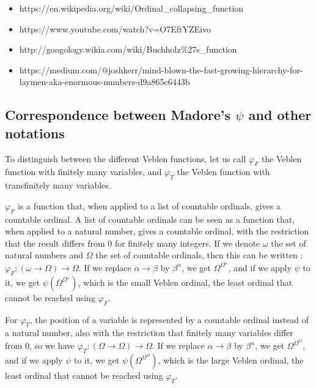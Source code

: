 \documentclass[10pt]{article}
\begin{document}
\begin{itemize}
     \setlength{\itemsep}{1pt}
     \setlength{\parskip}{0pt}
     \setlength{\parsep}{0pt}
\item https://en.wikipedia.org/wiki/Ordinal\_collapsing\_function
\item https://www.youtube.com/watch?v=O7EftYZEivo
\item http://googology.wikia.com/wiki/Buchholz\%27s\_function
\item https://medium.com/@joshkerr/mind-blown-the-fast-growing-hierarchy-for-laymen-aka-enormous-numbers-d9a865c6443b
\end{itemize}

\subsection{Correspondence between Madore's \( \psi \) and other notations}

To distinguish between the different Veblen functions, let us call \( \varphi_F \) the Veblen function with finitely many variables, and \( \varphi_T \) the Veblen function with transfinitely many variables.

\( \varphi_F \) is a function that, when applied to a list of countable ordinals, gives a countable ordinal. A list of countable ordinals can be seen as a function that, when applied to a natural number, gives a countable ordinal, with the restriction that the result differs from 0 for finitely many integers. If we denote \( \omega \) the set of natural numbers and \( \Omega \) the set of countable ordinals, then this can be written : \( \varphi_F : (\omega \rightarrow \Omega) \rightarrow \Omega \). If we replace \( \alpha \rightarrow \beta \) by \( \beta^\alpha \), we get \( \Omega^{\Omega^\omega} \), and if we apply \( \psi \) to it, we get \( \psi(\Omega^{\Omega^\omega}) \), which is the small Veblen ordinal, the least ordinal that cannot be reached using \( \varphi_F \).

For \( \varphi_T \), the position of a variable is represented by a countable ordinal instead of a natural number, also with the restriction that finitely many variables differ from 0, so we have \( \varphi_T : (\Omega \rightarrow \Omega) \rightarrow \Omega \). If we replace \( \alpha \rightarrow \beta \) by \( \beta^\alpha \), we get \( \Omega^{\Omega^\Omega} \), and if we apply \( \psi \) to it, we get \( \psi(\Omega^{\Omega^\Omega}) \), which is the large Veblen ordinal, the least ordinal that cannot be reached using \( \varphi_T \).
\end{document}
